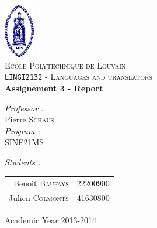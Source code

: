 \begin{titlepage}
 
\begin{center}
 
\vspace*{-2cm}\includegraphics[width=0.10\textwidth]{ucl.png}\\[1cm]
 
\textsc{\LARGE Ecole Polytechnique de Louvain}\\[1.5cm]
 
\textsc{\Large \texttt{LINGI2132} - Languages and translators }\\[0.5cm]
 
 
\vspace{1.0cm}
{ \huge \bfseries Assignement 3 - Report\vspace{0.8cm}\\}
 
\vspace{1.0cm}
 
\begin{minipage}{0.4\textwidth}
\begin{flushleft} \large
\emph{Professor :}\\
	Pierre \textsc{Schaus}\\
\vspace{1cm}
\emph{Program :}\\
	SINF21MS
\end{flushleft}
\end{minipage}
\begin{minipage}{0.4\textwidth}
\begin{flushright} \large
\emph{Students :} \\
\begin{tabular}{rl}
	Benoît \textsc{Baufays}		& {\footnotesize 22200900}\\
	Julien \textsc{Colmonts}	& {\footnotesize 41630800}\\

\end{tabular}
\end{flushright}
\end{minipage}
 
\vfill
 
\vspace{1.1cm}
{\large Academic Year 2013-2014}
\vspace{-1cm} 
\end{center}
 
\end{titlepage}
